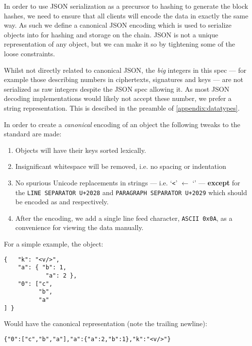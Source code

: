 In order to use JSON serialization as a precursor to hashing to generate the block hashes, we need to ensure that all clients will encode the data in exactly the same way. As such we define a canonical JSON encoding which is used to serialize objects into for hashing and storage on the chain. JSON is not a unique representation of any object, but we can make it so by tightening some of the loose constraints.

Whilst not directly related to canonical JSON, the \emph{big} integers in this spec --- for example those describing numbers in ciphertexts, signatures and keys --- are not serialized as raw integers despite the JSON spec allowing it. As most JSON decoding implementations would likely not accept these number, we prefer a string representation. This is descibed in the preamble of \autoref{appendix:datatypes}.

In order to create a \emph{canonical} encoding of an object the following tweaks to the standard are made:

\begin{enumerate}
  \item Objects will have their keys sorted lexically.
  \item Insignificant whitespace will be removed, i.e. no spacing or indentation
  \item No spurious Unicode replacements in strings --- i.e. `\texttt{<}' $\leftarrow$ `\texttt{}' --- \textbf{except} for the \texttt{LINE SEPARATOR U+2028} and \texttt{PARAGRAPH SEPARATOR U+2029} which should be encoded as \texttt{} and \texttt{} respectively.
  \item After the encoding, we add a single line feed character, \texttt{ASCII 0x0A}, as a convenience for viewing the data manually.
\end{enumerate}

For a simple example, the object:

\begin{lstlisting}[style=ES6]
{   "k": "<v/>",
    "a": { "b": 1,
            "a": 2 },
    "0": ["c",
          "b",
          "a"
] }
\end{lstlisting}

Would have the canonical representation (note the trailing newline):

\begin{lstlisting}[style=ES6]
{"0":["c","b","a"],"a":{"a":2,"b":1},"k":"<v/>"}

\end{lstlisting}

